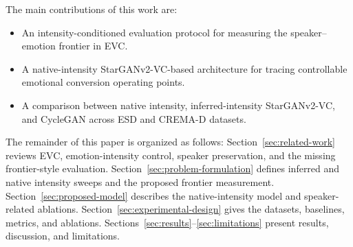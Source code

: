 The main contributions of this work are:
\begin{itemize}
    \item An intensity-conditioned evaluation protocol for measuring the speaker--emotion frontier in EVC.
    \item A native-intensity StarGANv2-VC-based architecture for tracing controllable emotional conversion operating points.
    \item A comparison between native intensity, inferred-intensity StarGANv2-VC, and CycleGAN across ESD \cite{zhou2021seen} and CREMA-D \cite{cao2014cremad} datasets.
\end{itemize}

The remainder of this paper is organized as follows:
Section~\ref{sec:related-work} reviews EVC, emotion-intensity control, speaker preservation, and the missing frontier-style evaluation.
Section~\ref{sec:problem-formulation} defines inferred and native intensity sweeps and the proposed frontier measurement.
Section~\ref{sec:proposed-model} describes the native-intensity model and speaker-related ablations.
Section~\ref{sec:experimental-design} gives the datasets, baselines, metrics, and ablations.
Sections~\ref{sec:results}--\ref{sec:limitations} present results, discussion, and limitations.
